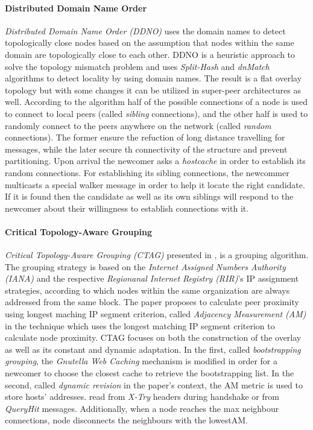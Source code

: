 \paragraph*{\bf Distributed Domain Name Order}
\emph{Distributed Domain Name Order (DDNO)} \cite{z-yk_ddno_2005} uses the
domain names to detect topologically close nodes based on the assumption that
nodes within the same domain are topologically close to each other. DDNO is
a heuristic approach to solve the topology mismatch problem and uses
\emph{Split-Hash} and \emph{dnMatch} algorithms to detect locality by using
domain names. The result is a flat overlay topology but with some changes it
can be utilized in super-peer architectures as well. According to the algorithm
half of the possible connections of a node is used to connect to local peers
(called \emph{sibling} connections), and the other half is used to randomly
connect to the peers anywhere on the network (called \emph{random} connections).
The former ensure the refuction of long distance travelling for messages, while
the later secure th connectivity of the structure and prevent partitioning. Upon
arrival the newcomer asks a \emph{hostcache} in order to establish its random
connections. For establishing its sibling connections, the newcommer multicasts
a special walker message in order to help it locate the right candidate. If it
is found then the candidate as well as its own siblings will respond to the
newcomer about their willingness to establish connections with it.

\paragraph*{\bf Critical Topology-Aware Grouping}
\emph{Critical Topology-Aware Grouping (CTAG)} presented in
\cite{zhao_ctag_2006}, is a grouping algorithm. The grouping strategy is based
on the \emph{Internet Assigned Numbers Authority (IANA)} and the respective
\emph{Regionanal Internet Registry (RIR)}'s IP assignment strategies, according
to which nodes within the same organization are always addressed from the same
block. The paper proposes to calculate peer proximity using longest maching IP
segment criterion, called \emph{Adjacency Measurement (AM)} in the technique
which uses the longest matching IP segment criterion to calculate node
proximity. CTAG focuses on both the construction of the overlay as well as its
constant and dynamic adaptation. In the first, called \emph{bootstrapping
grouping}, the \emph{Gnutella Web Caching} mechanism is modified in order for a
newcomer to choose the closest cache to retrieve the bootstrapping list. In the
second, called \emph{dynamic revision} in the paper's context, the AM metric is
used to store hosts' addresses. read from \emph{X-Try} headers during handshake
or from \emph{QueryHit} messages. Additionally, when a node reaches the max
neighbour connections, node disconnects the neighbours with the lowestAM.

